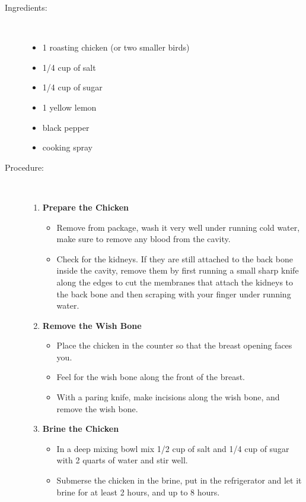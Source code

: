\documentclass[11pt,letterpaper]{article}
\begin{document}
 
\begin {description}

\item[Ingredients:]\ \\
\begin{itemize}
	\item 1 roasting chicken (or two smaller birds)
	\item 1/4 cup of salt
	\item 1/4 cup of sugar
	\item 1 yellow lemon
	\item black pepper
	\item cooking spray
\end{itemize}

\item[Procedure:]\ \\

\begin{enumerate}
\item {\bf Prepare the Chicken}
\begin{itemize}
\item Remove from package, wash it very well under running cold water, make sure to remove any blood from the cavity. 
\item Check for the kidneys. If they are still attached to the back bone inside the cavity, remove them by first running a small sharp knife along the edges to cut the membranes that attach the kidneys to the back bone and then scraping with your finger under running water.
\end{itemize}

\item {\bf Remove the Wish Bone}
\begin{itemize}
\item Place the chicken in the counter so that the breast opening faces you. 
\item Feel for the wish bone along the front of the breast. 
\item With a paring knife, make incisions along the wish bone, and remove the wish bone. 
\end{itemize}

\item {\bf Brine the Chicken}
\begin{itemize}
\item In a deep mixing bowl mix 1/2 cup of salt and 1/4 cup of sugar with 2 quarts of water and stir well. 
\item Submerse the chicken in the brine, put in the refrigerator and let it brine for at least 2 hours, and up to 8 hours.
\end{itemize}




\end{enumerate}
\end{description}
\end{document}
